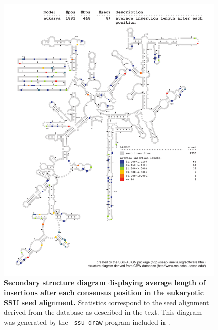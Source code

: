 \begin{figure}
\begin{center}
\includegraphics[width=5.7in]{Figures/eukarya-0p1-iavglen}
\end{center}
\caption[Secondary structure diagram displaying average length of insertions
  after each consensus position in the eukaryotic SSU seed
  alignment]{\textbf{Secondary structure diagram displaying average
    length of insertions after each consensus position in the eukaryotic SSU seed
  alignment.} Statistics correspond to the  seed
  alignment derived from the  database \cite{CannoneGutell02}
  as described in the text. This diagram was generated by the {\tt
  ssu-draw} program included in .}
\label{fig:eukiavglen}
\end{figure}

